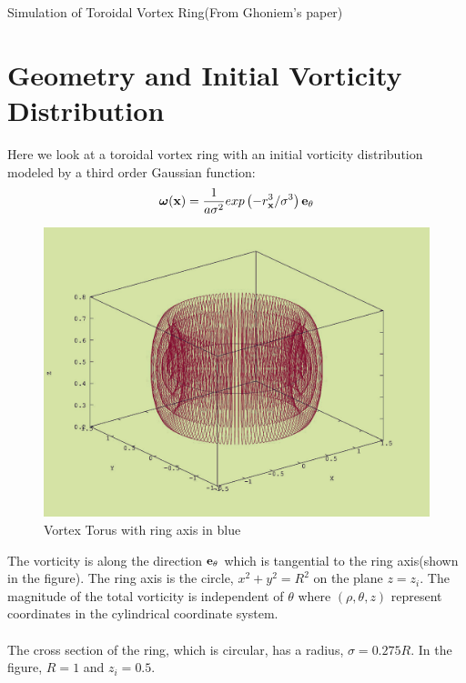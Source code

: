 \documentclass[10pt,a4paper]{report}
\newcommand{\omegav}{{\boldsymbol \omega}}
\newcommand{\xv}{{\bf x}}
\newcommand{\et}{{\bf e}_\theta}
\begin{document}
\begin{huge}
Simulation of Toroidal Vortex Ring(From Ghoniem's paper\cite{ghoniem})
\end{huge}
\section{Geometry and Initial Vorticity Distribution}

Here we look at a toroidal vortex ring with an initial vorticity distribution modeled by a third order Gaussian function:
\begin{equation}
\omegav (\xv) = \frac{1}{a\sigma^2} exp\left(-r_\xv^3/\sigma^3\right) \et
\end{equation} 
\begin{figure}
\includegraphics[scale=0.3]{geometry.jpg}
\caption{Vortex Torus with ring axis in blue}
\end{figure}
The vorticity is along the direction $\et$ which is tangential to the ring axis(shown in the figure). The ring axis is the circle, $x^2 + y^2 = R^2$ on the plane $z=z_i$.
The magnitude of the total vorticity is independent of $\theta$ where $(\rho,\theta, z)$ represent coordinates in the cylindrical coordinate system.
\paragraph{}
The cross section of the ring, which is circular, has a radius, $\sigma = 0.275 R$. In the figure, $R = 1$ and $z_i = 0.5$.
\end{document}
